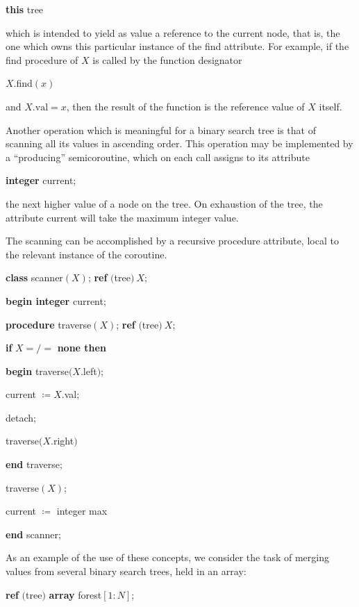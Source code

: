 \documentclass[twoside,11pt]{book}
\begin{document}
\quad \textbf{this} tree

\noindent
which is intended to yield as value a reference to the current node, that is, the one which owns this particular instance of the find attribute. For example, if the find procedure of $X$ is called by the function designator 

\quad $X.$find$(x)$

\noindent
and $X.\text{val} = x$, then the result of the function is the reference value of $X$ itself.

Another operation which is meaningful for a binary search tree is that of scanning all its values in ascending order. This operation may be implemented by a ``producing'' semicoroutine, which on each call assigns to its attribute

\quad \textbf{integer} current;

\noindent
the next higher value of a node on the tree. On exhaustion of the tree, the attribute current will take the maximum integer value.

The scanning can be accomplished by a recursive procedure attribute, local to the relevant instance of the coroutine.

\quad \textbf{class} scanner$(X)$; \textbf{ref} $($tree$)\ X$;

\quad \quad \textbf{begin integer} current;

\quad \quad \quad \textbf{procedure} traverse$(X)$; \textbf{ref} $($tree$)\ X$;

\quad \quad \quad \quad \textbf{if} $X =/=$ \textbf{none then}

\quad \quad \quad \quad \quad \textbf{begin} traverse$(X$.left$)$;

\quad \quad \quad \quad \quad \quad current $\coloneq X$.val;

\quad \quad \quad \quad \quad \quad detach;

\quad \quad \quad \quad \quad \quad traverse$(X$.right$)$

\quad \quad \quad \quad \quad \textbf{end} traverse;

\quad \quad \quad traverse$(X)$;

\quad \quad \quad current $\coloneq$ integer max

\quad \quad \textbf{end} scanner;

As an example of the use of these concepts, we consider the task of merging values from several binary search trees, held in an array:

\quad \textbf{ref} $($tree$)$ \textbf{array} forest$[1: N]$;
\end{document}
